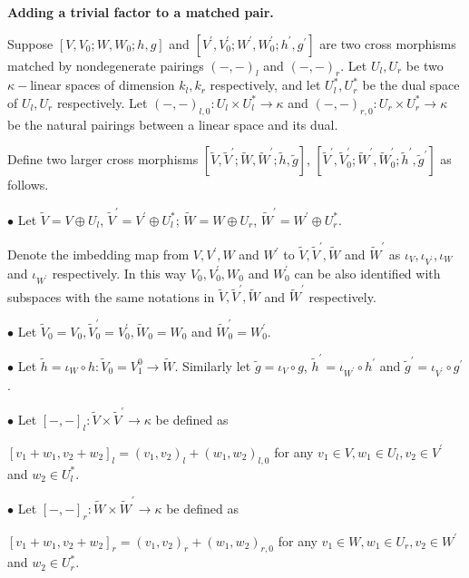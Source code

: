 \def\CTEXPreproc{Created by ctex v0.2.12, don't edit!}\documentclass[11pt]{article}
\begin{document}
\noindent \textbf{Adding a trivial factor to a matched pair.}

Suppose $[V , V_0; W ,W_0 ; h , g ]$ and $[ V^{'} , V^{'} _0 ; W^{'}, W^{'} _0 ; h^{'} , g^{'}  ]   $ are two cross morphisms matched by  nondegenerate pairings  $(-,-)_l$ and $(-,-)_r$.    Let $U_l ,U_r $ be two $\kappa-$linear spaces of dimension $k_l ,k_r $ respectively, and let $U^{*}_l , U^{*}_r$ be the dual space of $U_l ,U_r $ respectively. Let $(- ,-  )_{l,0} : U_l \times U^{*}_l \rightarrow \kappa   $ and
$ (- ,-  )_{r,0} : U_r \times U^{*}_r \rightarrow \kappa    $ be the natural pairings between a linear space and its dual.

Define two larger cross  morphisms $[ \tilde{V} , \tilde{V}^{'}; \tilde{W} ,\tilde{W}^{'} ; \tilde{h} , \tilde{g} ]$,
$[ \tilde{V}^{'} , \tilde{V}^{'}_0 ; \tilde{W}^{'} , \tilde{W}^{'} _0 ; \tilde{h}^{'} , \tilde{g}^{'}  ]   $ as follows.

\noindent $\bullet$ Let $\tilde{V} = V \oplus U_l   $, $\tilde{V}^{'} = V^{'} \oplus U^{*}_l $;  $\tilde{W} = W \oplus U_r $, $\tilde{W}^{'} = W^{'} \oplus U^{*}_r $.

 Denote the imbedding map from  $V , V^{'} , W  $ and $W^{'}$ to $\tilde{V}  , \tilde{V}^{'} , \tilde{W}  $ and $\tilde{W}^{'}$ as $\iota_{V } , \iota_{V^{'}} ,\iota_{W}   $ and $\iota_{W^{'} } $ respectively.
 In this way  $V_0  , V^{'} _0 , W_0  $ and $W^{'} _0$ can be also identified with subspaces with the same notations in $\tilde{V} , \tilde{V}^{'} , \tilde{W}  $ and $\tilde{W}^{'}$ respectively.

\noindent $\bullet$  Let $\tilde{V}_0 = V_0  , \tilde{V}^{'}_0 = V^{'}_0, \tilde{W}_0 =W_0 $ and $\tilde{W}^{'}_0 = W^{'}_0$.

\noindent $\bullet$ Let $\tilde{h} = \iota_{W }\circ h : \tilde{V}_0 = V^0 _1 \rightarrow \tilde{W }$. Similarly let $\tilde{g} =\iota_{V}\circ g  $, $\tilde{h}^{'} = \iota_{W^{'}} \circ h^{'}   $ and $ \tilde{g}^{'}= \iota_{V^{'} }\circ g^{'}  $.

\noindent $\bullet$ Let $[-,-]_l : \tilde{V} \times \tilde{V}^{'} \rightarrow \kappa$ be defined as

 $[ v_1 +w_1 , v_2 + w_2   ]_l = ( v_1 , v_2    )_l + ( w_1 , w_2  )_{l,0} $ for any $v_1 \in V , w_1 \in U_l , v_2 \in V^{'} $ and $w_2 \in U^{*}_l$.

\noindent $\bullet$ Let $[-,-]_r : \tilde{W} \times \tilde{W}^{'} \rightarrow \kappa$ be defined as

 $[ v_1 +w_1 , v_2 + w_2   ]_r = ( v_1 , v_2    )_r + ( w_1 , w_2  )_{r,0} $ for any $v_1 \in W , w_1 \in U_r , v_2 \in W^{'} $ and $w_2 \in U^{*}_r$.
\end{document}
